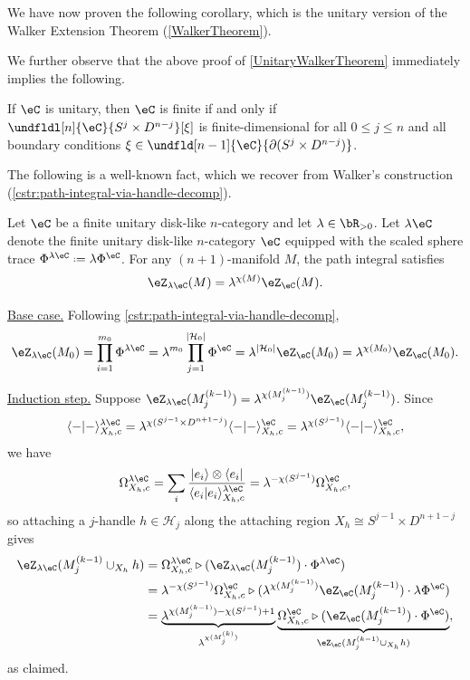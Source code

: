 \documentclass[12pt,reqno]{amsart}
\newcommand{\psn}{\Phi}
\newcommand{\C}{\eC}
\newcommand{\Z}{\eZ}
\newcommand{\bra}[1]{\langle#1\rvert}
\newcommand{\ket}[1]{\lvert#1\rangle}
\newcommand{\bkt}[2]{\langle #1|#2 \rangle}
\newcommand{\itemstep}[1]{\smallskip\noindent\underline{#1}}
\DeclareRobustCommand{\coloneq}{\mathrel{\vcenter{\baselineskip0.5ex\lineskiplimit0pt\hbox{\scriptsize{\upshape.}}\hbox{\scriptsize{\upshape.}}}}=}
\begin{document}
We have now proven the following corollary, which is the unitary version of the Walker Extension Theorem (\cref{WalkerTheorem}).

\UnitaryWalkerTheorem*

We further observe that the above proof of \cref{UnitaryWalkerTheorem} immediately implies the following.

\begin{corollary}
\label{cor:psnF-weaker}
If $\C$ is unitary, then $\C$ is finite if and only if $\undfldl[n]{\C}{S^j\times D^{n-j}}[\xi]$ is finite-dimensional for all $0\leq j\leq n$ and all boundary conditions $\xi\in\undfld[n-1]{\C}{\partial(S^j\times D^{n-j})}$.
\end{corollary}

The following is a well-known fact, which we recover from Walker's construction (\cref{cstr:path-integral-via-handle-decomp}).

\begin{proposition}
Let $\C$ be a finite unitary disk-like $n$-category and let $\lambda \in \bR_{>0}$. Let $\lambda\C$ denote the finite unitary disk-like $n$-category $\C$ equipped with the scaled sphere trace $\psn^{\lambda\C} \coloneq \lambda \psn^\C$. For any $(n+1)$-manifold $M$, the path integral satisfies
\[
\Z_{\lambda\C}(M) = \lambda^{\chi(M)} \Z_\C(M).
\]
\end{proposition}

\begin{pf}
\itemstep{Base case.} Following \cref{cstr:path-integral-via-handle-decomp},
\[
\Z_{\lambda\C}(M_0) = \prod_{i=1}^{m_0} \psn^{\lambda\C} = \lambda^{m_0} \prod_{j=1}^{|\mathcal{H}_0|} \psn^{\C} = \lambda^{|\mathcal{H}_0|} \Z_{\C}(M_0) = \lambda^{\chi(M_0)} \Z_{\C}(M_0).
\]

\itemstep{Induction step.} Suppose $\Z_{\lambda\C}(M_j^{(k-1)}) = \lambda^{\chi(M_j^{(k-1)})} \Z_{\C}(M_j^{(k-1)})$. Since
\[
\bkt--^{\lambda\C}_{X_h, c} = \lambda^{\chi(S^{j-1} \times D^{n+1-j})} \langle - | - \rangle^{\C}_{X_h, c} = \lambda^{\chi(S^{j-1})} \langle - | - \rangle^{\C}_{X_h, c} ,
\]
we have
\[
\Omega^{\lambda\C}_{X_h, c} = \sum_i \frac{\ket{e_i} \otimes \bra{e_i}}{\bkt{e_i}{e_i}^{\lambda\C}_{X_h, c}} = \lambda^{-\chi(S^{j-1})} \Omega^{\C}_{X_h, c},
\]
so attaching a $j$-handle $h \in \mathcal{H}_j$ along the attaching region $X_h \cong S^{j-1} \times D^{n+1-j}$ gives
\begin{align*}
\Z_{\lambda\C}(M_j^{(k-1)} \cup_{X_h} h) &= \Omega^{\lambda\C}_{X_h, c} \triangleright (\Z_{\lambda\C}(M_j^{(k-1)}) \cdot \psn^{\lambda\C}) \\
&= \lambda^{-\chi(S^{j-1})} \Omega^{\C}_{X_h, c} \triangleright (\lambda^{\chi(M_j^{(k-1)})} \Z_{\C}(M_j^{(k-1)}) \cdot \lambda \psn^{\C}) \\
&= \underbrace{\lambda^{\chi(M_j^{(k-1)}) - \chi(S^{j-1}) + 1}}_{\lambda^{\chi(M_j^{(k)})}} \underbrace{\Omega^{\C}_{X_h, c} \triangleright (\Z_{\C}(M_j^{(k-1)}) \cdot \psn^{\C})}_{\Z_{\C}(M_j^{(k-1)} \cup_{X_h} h)} ,
\end{align*}
as claimed.
\end{pf}
\end{document}
